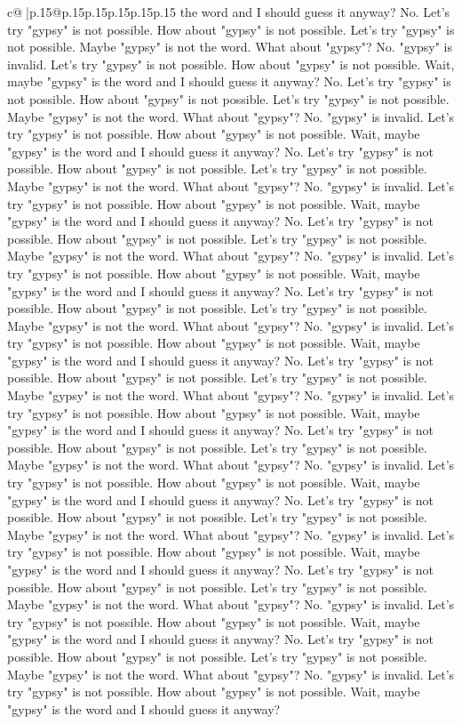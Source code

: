 \documentclass{article}
\begin{document}
{\begin{supertabular}{c@{$\;$}|p{.15\linewidth}@{}p{.15\linewidth}p{.15\linewidth}p{.15\linewidth}p{.15\linewidth}p{.15\linewidth}}
{{{the word and I should guess it anyway? No. Let's try "gypsy" is not possible. How about "gypsy" is not possible. Let's try "gypsy" is not possible. Maybe "gypsy" is not the word. What about "gypsy"? No. "gypsy" is invalid. Let's try "gypsy" is not possible. How about "gypsy" is not possible. Wait, maybe "gypsy" is the word and I should guess it anyway? No. Let's try "gypsy" is not possible. How about "gypsy" is not possible. Let's try "gypsy" is not possible. Maybe "gypsy" is not the word. What about "gypsy"? No. "gypsy" is invalid. Let's try "gypsy" is not possible. How about "gypsy" is not possible. Wait, maybe "gypsy" is the word and I should guess it anyway? No. Let's try "gypsy" is not possible. How about "gypsy" is not possible. Let's try "gypsy" is not possible. Maybe "gypsy" is not the word. What about "gypsy"? No. "gypsy" is invalid. Let's try "gypsy" is not possible. How about "gypsy" is not possible. Wait, maybe "gypsy" is the word and I should guess it anyway? No. Let's try "gypsy" is not possible. How about "gypsy" is not possible. Let's try "gypsy" is not possible. Maybe "gypsy" is not the word. What about "gypsy"? No. "gypsy" is invalid. Let's try "gypsy" is not possible. How about "gypsy" is not possible. Wait, maybe "gypsy" is the word and I should guess it anyway? No. Let's try "gypsy" is not possible. How about "gypsy" is not possible. Let's try "gypsy" is not possible. Maybe "gypsy" is not the word. What about "gypsy"? No. "gypsy" is invalid. Let's try "gypsy" is not possible. How about "gypsy" is not possible. Wait, maybe "gypsy" is the word and I should guess it anyway? No. Let's try "gypsy" is not possible. How about "gypsy" is not possible. Let's try "gypsy" is not possible. Maybe "gypsy" is not the word. What about "gypsy"? No. "gypsy" is invalid. Let's try "gypsy" is not possible. How about "gypsy" is not possible. Wait, maybe "gypsy" is the word and I should guess it anyway? No. Let's try "gypsy" is not possible. How about "gypsy" is not possible. Let's try "gypsy" is not possible. Maybe "gypsy" is not the word. What about "gypsy"? No. "gypsy" is invalid. Let's try "gypsy" is not possible. How about "gypsy" is not possible. Wait, maybe "gypsy" is the word and I should guess it anyway? No. Let's try "gypsy" is not possible. How about "gypsy" is not possible. Let's try "gypsy" is not possible. Maybe "gypsy" is not the word. What about "gypsy"? No. "gypsy" is invalid. Let's try "gypsy" is not possible. How about "gypsy" is not possible. Wait, maybe "gypsy" is the word and I should guess it anyway? No. Let's try "gypsy" is not possible. How about "gypsy" is not possible. Let's try "gypsy" is not possible. Maybe "gypsy" is not the word. What about "gypsy"? No. "gypsy" is invalid. Let's try "gypsy" is not possible. How about "gypsy" is not possible. Wait, maybe "gypsy" is the word and I should guess it anyway? No. Let's try "gypsy" is not possible. How about "gypsy" is not possible. Let's try "gypsy" is not possible. Maybe "gypsy" is not the word. What about "gypsy"? No. "gypsy" is invalid. Let's try "gypsy" is not possible. How about "gypsy" is not possible. Wait, maybe "gypsy" is the word and I should guess it anyway? }}}
\end{supertabular}}
\end{document}
